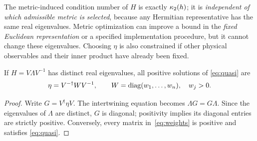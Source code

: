 \begin{remark}
The metric-induced condition number of $H$ is exactly $\kappa_2(h)$; it is
\emph{independent of which admissible metric is selected}, because any Hermitian
representative has the same real eigenvalues. Metric optimization can improve a bound
in the \emph{fixed Euclidean representation} or a specified implementation procedure,
but it cannot change these eigenvalues. Choosing $\eta$ is also constrained if
other physical observables and their inner product have already been fixed.
\end{remark}

\begin{proposition}\label{prop:weights}
If $H=V\Lambda V^{-1}$ has distinct real eigenvalues, all positive solutions of
\eqref{eq:quasi} are
\begin{equation}\label{eq:weights}
 \eta=V^{-\dagger}WV^{-1},\qquad
 W=\operatorname{diag}(w_1,\ldots,w_n),\quad w_j>0.
\end{equation}
\end{proposition}
\begin{proof}
Write $G=V^\dagger\eta V$. The intertwining equation becomes
$\Lambda G=G\Lambda$. Since the eigenvalues of $\Lambda$ are distinct,
$G$ is diagonal; positivity implies its diagonal entries are strictly positive.
Conversely, every matrix in~\eqref{eq:weights} is positive and satisfies
\eqref{eq:quasi}.
\end{proof}

